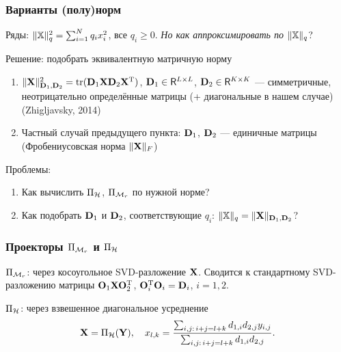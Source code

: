 \documentclass[unicode, notheorems]{beamer}
\begin{document}
\begin{frame}
	\frametitle{Варианты (полу)норм}
	Ряды:
	$\|\mathbb{X}\|_q^2 = \sum_{i = 1}^N q_i x_i^2$, все $q_i \ge 0$. \textit{Но как аппроксимировать по }$\|\mathbb{X}\|_q$?
	
	\vspace{0.4cm}
	Решение: подобрать эквивалентную матричную норму
	
	\begin{enumerate}
		\item $\|\mathbf{X}\|^2_{\mathbf{D}_1, \mathbf{D}_2} = \text{tr}(\mathbf{D}_1 \mathbf{X} \mathbf{D}_2 \mathbf{X}^{\mathrm{T}})$, $\mathbf{D}_1 \in \mathsf{R}^{L \times L}$, $\mathbf{D}_2 \in \mathsf{R}^{K \times K}$ --- симметричные, неотрицательно определённые матрицы (+ диагональные в нашем случае) (Zhigljavsky, 2014)
		\item Частный случай предыдущего пункта: $\mathbf{D}_1$, $\mathbf{D}_2$ --- единичные матрицы (Фробениусовская норма $\|\mathbf{X}\|_F$)

	\end{enumerate}
	
	\vspace{0.4cm}
	Проблемы:
	\begin{enumerate}
		\item Как вычислить $\Pi_{\mathcal{H}}$, $\Pi_{\mathcal{M}_r}$ по нужной норме?
		\item Как подобрать $\mathbf{D}_1$ и $\mathbf{D}_2$, соответствующие $q_i$: $\|\mathbb{X}\|_q = \|\mathbf{X}\|_{\mathbf{D}_1, \mathbf{D}_2}$?
	\end{enumerate}
\end{frame}

\begin{frame}
	\frametitle{Проекторы $\Pi_{\mathcal{M}_r}$ и $\Pi_{\mathcal{H}}$}
	
	$\Pi_{\mathcal{M}_r}$: через косоугольное SVD-разложение $\mathbf{X}$. Сводится к стандартному SVD-разложению матрицы $\mathbf{O}_1 \mathbf{X} \mathbf{O}_2^{\mathrm{T}}$, $\mathbf{O}_i^{\mathrm{T}} \mathbf{O}_i = \mathbf{D}_i$, $i = 1, 2.$
		
	\vspace{0.6cm}
	$\Pi_{\mathcal{H}}$: через взвешенное диагональное усреднение
	\begin{equation*}
	\mathbf{X} = \Pi_{\mathcal{H}}(\mathbf{Y}), \quad x_{l,k} = \frac{\sum_{i,j:\, i+j=l+k} d_{1, i} d_{2, j} y_{i,j}}{\sum_{i,j:\, i+j=l+k} d_{1, i} d_{2, j}}.
	\end{equation*}
\end{frame}
\end{document}

